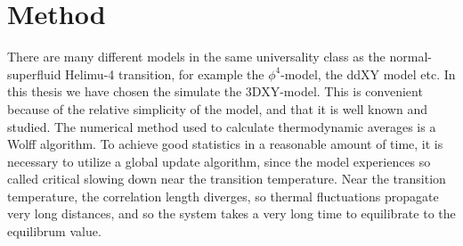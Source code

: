 %
\section{Method}
There are many different models in the same universality class as the normal-superfluid Helimu-4 transition, for example the $\phi^4$-model, the ddXY model etc.
In this thesis we have chosen the simulate the 3DXY-model. This is convenient because of the relative simplicity of the model, and that it is well known and studied.
The numerical method used to calculate thermodynamic averages is a Wolff algorithm.
To achieve good statistics in a reasonable amount of time, it is necessary to utilize a global update algorithm, since the model experiences so called critical slowing down near the transition temperature. 
Near the transition temperature, the correlation length diverges, so thermal fluctuations propagate very long distances, and so the system takes a very long time to equilibrate to the equilibrum value.
